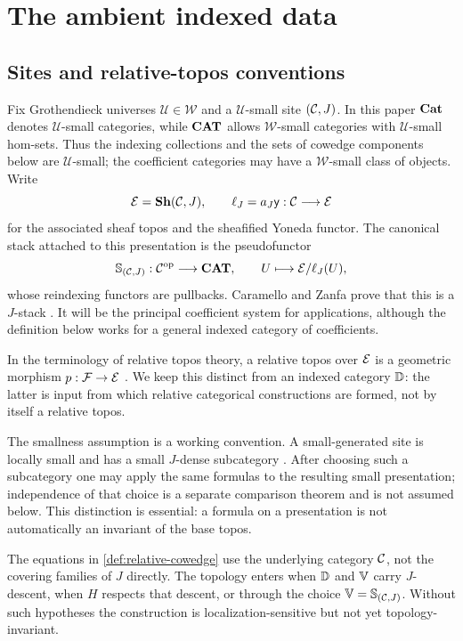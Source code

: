 \section{The ambient indexed data}
\label{sec:ambient}

\subsection{Sites and relative-topos conventions}
\label{subsec:sites}

Fix Grothendieck universes \(\mathcal U\in\mathcal W\) and a
\(\mathcal U\)-small site \((\mathcal{C},J)\).  In this paper \(\mathbf{Cat}\) denotes
\(\mathcal U\)-small categories, while \(\mathbf{CAT}\) allows
\(\mathcal W\)-small categories with \(\mathcal U\)-small hom-sets.  Thus
the indexing collections and the sets of cowedge components below are
\(\mathcal U\)-small; the coefficient categories may have a
\(\mathcal W\)-small class of objects.  Write
\[
  \mathcal{E}=\mathbf{Sh}(\mathcal{C},J),
  \qquad
  \ell_J=a_J\mathsf{y}:\mathcal{C}\longrightarrow\mathcal{E}
\]
for the associated sheaf topos and the sheafified Yoneda functor.  The
canonical stack attached to this presentation is the pseudofunctor
\[
  \mathbb{S}_{(\mathcal{C},J)}:\mathcal{C}^{\mathrm{op}}\longrightarrow\mathbf{CAT},
  \qquad
  U\longmapsto \mathcal{E}/\ell_J(U),
\]
whose reindexing functors are pullbacks.  Caramello and Zanfa prove that this
is a \(J\)-stack \cite[Definition~2.6.4 and Theorem~2.6.8]{CaramelloZanfa2021}.
It will be the principal coefficient system for applications, although the
definition below works for a general indexed category of coefficients.

In the terminology of relative topos theory, a relative topos over \(\mathcal{E}\) is
a geometric morphism \(p:\mathcal F\to\mathcal{E}\)
\cite[Definition~8.2.2]{CaramelloZanfa2021}.  We keep this distinct from an
indexed category \(\mathbb{D}\): the latter is input from which relative categorical
constructions are formed, not by itself a relative topos.

The smallness assumption is a working convention.  A small-generated site is
locally small and has a small \(J\)-dense subcategory
\cite[p.~4]{CaramelloZanfa2021}.  After choosing such a subcategory one may
apply the same formulas to the resulting small presentation; independence of
that choice is a separate comparison theorem and is not assumed below.  This
distinction is essential: a formula on a presentation is not automatically
an invariant of the base topos.

\begin{remark}
\label{rem:topology-entry}
The equations in \cref{def:relative-cowedge} use the underlying category
\(\mathcal{C}\), not the covering families of \(J\) directly.  The topology enters
when \(\mathbb{D}\) and \(\mathbb{V}\) carry \(J\)-descent, when \(H\) respects that descent,
or through the choice \(\mathbb{V}=\mathbb{S}_{(\mathcal{C},J)}\).  Without such hypotheses the
construction is localization-sensitive but not yet topology-invariant.
\end{remark}


